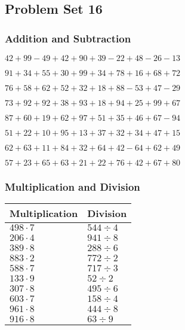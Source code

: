 \hypertarget{problem-set-16}{%
\subsection{Problem Set 16}\label{problem-set-16}}

\hypertarget{addition-and-subtraction}{%
\subsubsection{Addition and
Subtraction}\label{addition-and-subtraction}}

\(42+99-49+42+90+39-22+48-26-13\)

\(91+34+55+30+99+34+78+16+68+72\)

\(76+58+62+52+32+18+88-53+47-29\)

\(73+92+92+38+93+18+94+25+99+67\)

\(87+60+19+62+97+51+35+46+67-94\)

\(51+22+10+95+13+37+32+34+47+15\)

\(62+63+11+84+32+64+42-64+62+49\)

\(57+23+65+63+21+22+76+42+67+80\)

\hypertarget{multiplication-and-division}{%
\subsubsection{Multiplication and
Division}\label{multiplication-and-division}}

\begin{longtable}[]{@{}ll@{}}
\toprule
Multiplication & Division\tabularnewline
\midrule
\endhead
\(498\cdot7\) & \(544÷4\)\tabularnewline
\(206\cdot4\) & \(941÷8\)\tabularnewline
\(389\cdot8\) & \(288÷6\)\tabularnewline
\(883\cdot2\) & \(772÷2\)\tabularnewline
\(588\cdot7\) & \(717÷3\)\tabularnewline
\(133\cdot9\) & \(52÷2\)\tabularnewline
\(307\cdot8\) & \(495÷6\)\tabularnewline
\(603\cdot7\) & \(158÷4\)\tabularnewline
\(961\cdot8\) & \(444÷8\)\tabularnewline
\(916\cdot8\) & \(63÷9\)\tabularnewline
\bottomrule
\end{longtable}
